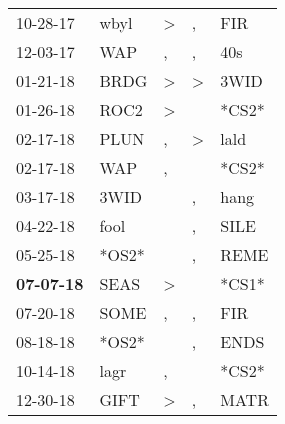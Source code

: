 \begin{supertabular}{p{0.07\textwidth}p{0.06\textwidth}p{0.02\textwidth}p{0.02\textwidth}p{0.06\textwidth}}
          10-28-17\textsuperscript{} &           wbyl\textsuperscript{} &     \textgreater &                , &            FIR\textsuperscript{} \\
          12-03-17\textsuperscript{} &            WAP\textsuperscript{} &                , &                , &            40s\textsuperscript{} \\
          01-21-18\textsuperscript{} &           BRDG\textsuperscript{} &     \textgreater &     \textgreater &           3WID\textsuperscript{} \\
          01-26-18\textsuperscript{} &           ROC2\textsuperscript{} &     \textgreater &                  &                            *CS2* \\
          02-17-18\textsuperscript{} &           PLUN\textsuperscript{} &                , &     \textgreater &           lald\textsuperscript{} \\
          02-17-18\textsuperscript{} &            WAP\textsuperscript{} &                , &                  &                            *CS2* \\
          03-17-18\textsuperscript{} &           3WID\textsuperscript{} &                  &                , &           hang\textsuperscript{} \\
          04-22-18\textsuperscript{} &           fool\textsuperscript{} &                  &                , &           SILE\textsuperscript{} \\
          05-25-18\textsuperscript{} &                            *OS2* &                  &                , &           REME\textsuperscript{} \\
 \textbf{07-07-18\textsuperscript{}} &           SEAS\textsuperscript{} &     \textgreater &                  &                            *CS1* \\
          07-20-18\textsuperscript{} &           SOME\textsuperscript{} &                , &                , &            FIR\textsuperscript{} \\
          08-18-18\textsuperscript{} &                            *OS2* &                  &                , &           ENDS\textsuperscript{} \\
          10-14-18\textsuperscript{} &           lagr\textsuperscript{} &                , &                  &                            *CS2* \\
          12-30-18\textsuperscript{} &           GIFT\textsuperscript{} &     \textgreater &                , &           MATR\textsuperscript{} \\

\end{supertabular}
